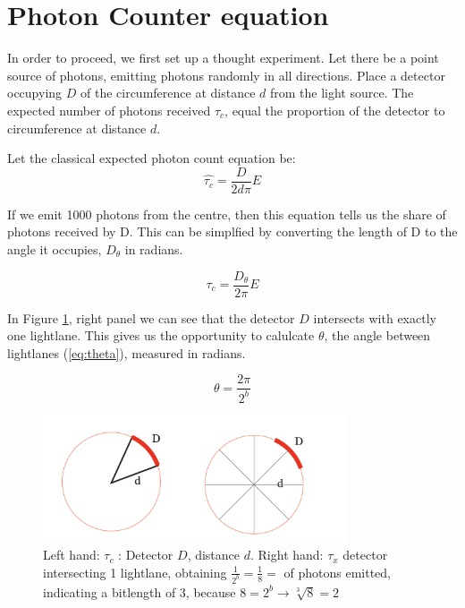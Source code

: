\documentclass[notitlepage]{article}
\begin{document}
\section{Photon Counter equation}

In order to proceed, we first set up a thought experiment. Let there be a point source of photons, emitting photons randomly in all directions. Place a detector occupying $D$ of the circumference at distance $d$ from the light source. The expected number of photons received $\tau_c $, equal the proportion of the detector to circumference at distance $d$. 

Let the classical expected photon count equation be:
\begin{equation}\label{eq:classicalPC}
\hat{\tau_c} =  \frac{D}{2 d\pi}E 
\end{equation}

If we emit 1000 photons from the centre, then this equation tells us the share of photons received by D. This can be simplfied by converting the length of D to the angle it occupies, $D_\theta$ in radians.

\begin{equation}\label{eq:classicalPCTheta}
\hat{\tau_c} =  \frac{D_\theta}{2 \pi}E 
\end{equation}

In Figure \ref{fig:thejuul}, right panel we can see that the detector $D$ intersects with exactly one lightlane. This gives us the opportunity to calulcate $\theta$,  the angle between lightlanes (\ref{eq:theta}), measured in radians. 

\begin{equation}
\theta = \frac{2\pi}{2^b}
\label{eq:theta}
\end{equation}



\begin{figure}[!ht]
  \centering

 \includegraphics[width=0.8\textwidth, trim={0cm 0cm 0cm 0cm},clip]{Illustrations/Fig1_2.pdf}
  \caption{Left hand: $\tau_c$ : Detector $D$, distance $d$. Right hand: $\tau_x$ detector intersecting 1 lightlane, obtaining $\frac{1}{2^b}  = \frac{1}{8} =  $ of photons emitted, indicating a bitlength of 3, because  $ 8 = 2^b \rightarrow \sqrt[3]{8}  = 2  $ }
      \label{fig:thejuul}
\end{figure}
\end{document}

